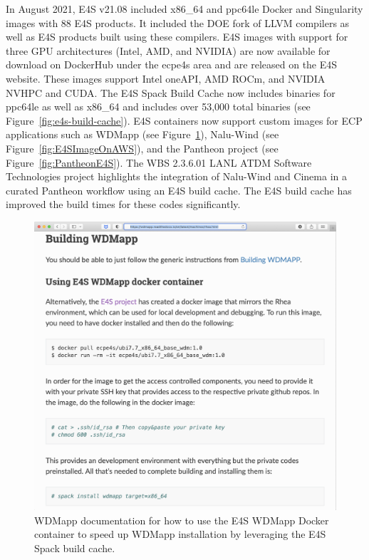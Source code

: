 In August 2021, E4S v21.08 included x86\_64 and ppc64le Docker and Singularity images with 88 E4S products. It included the DOE fork of LLVM compilers as well as E4S products built using these compilers. E4S images with support for three GPU architectures (Intel, AMD, and NVIDIA) are now available for download on DockerHub under the ecpe4s area and are released on the E4S website. These images support Intel oneAPI, AMD ROCm, and NVIDIA NVHPC and CUDA. The E4S Spack Build Cache now includes binaries for ppc64le as well as x86\_64 and includes over 53,000 total binaries (see Figure~\ref{fig:e4s-build-cache}). E4S containers now support custom images for ECP applications such as WDMapp (see Figure~\ref{fig:SpackBuildCacheWDMapp}), Nalu-Wind (see Figure~\ref{fig:E4SImageOnAWS}), and the Pantheon project (see Figure~\ref{fig:PantheonE4S}). The WBS 2.3.6.01 LANL ATDM Software Technologies project highlights the integration of Nalu-Wind and Cinema in a curated Pantheon workflow using an E4S build cache. The E4S build cache has improved the build times for these codes significantly. 
\begin{figure}
        \centering
        \includegraphics[width=0.82\linewidth]{projects/2.3.5-Ecosystem/2.3.5.01-Ecosystem-SDK/E4S_WDMApp}
        \caption{WDMapp documentation for how to use the E4S WDMapp Docker container to speed up WDMapp installation by leveraging the E4S Spack build cache.}
        \label{fig:SpackBuildCacheWDMapp}
\end{figure}

